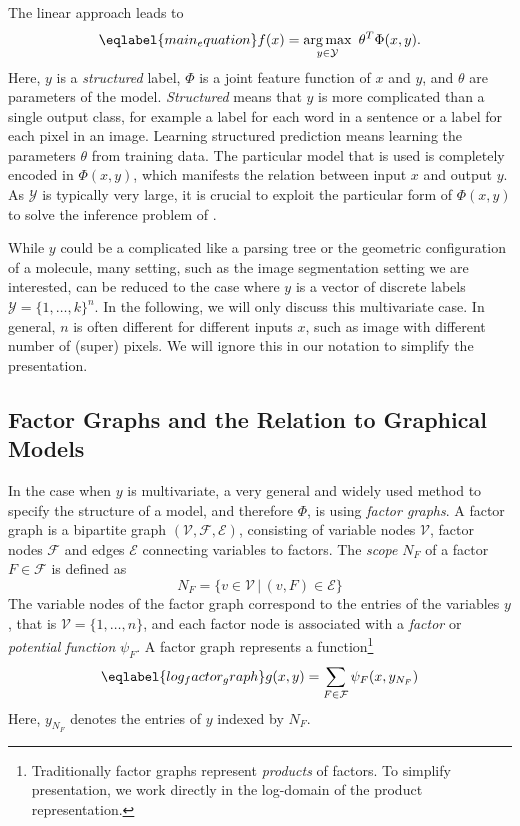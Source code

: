 The linear approach leads to
\begin{equation}\eqlabel{main_equation}
    f(x) = \argmax_{y \in \mathcal{Y}}\  \theta^T \Phi(x, y).
\end{equation}
Here, $y$ is a \emph{structured} label, $\Phi$ is a joint feature function of
$x$ and $y$, and $\theta$ are parameters of the model. \emph{Structured} means
that $y$ is more complicated than a single output class, for example a label
for each word in a sentence or a label for each pixel in an image.
Learning structured prediction means learning the parameters $\theta$ from
training data.  The particular model that is used is completely encoded in
$\Phi(x, y)$, which manifests the relation between input $x$ and output $y$. As
$\mathcal{Y}$ is typically very large, it is crucial to exploit the particular
form of $\Phi(x, y)$ to solve the inference problem of .

While $y$ could be a complicated like a parsing tree or the geometric
configuration of a molecule, many setting, such as the image segmentation
setting we are interested, can be reduced to the case where $y$ is a vector of
discrete labels $\mathcal{Y} = \{1, \dotsc, k\}^n$.
In the following, we will only discuss this multivariate case. In general, $n$
is often different for different inputs $x$, such as image with different
number of (super) pixels.  We will ignore this in our notation to simplify the
presentation.

\subsection{Factor Graphs and the Relation to Graphical Models}
In the case when $y$ is multivariate, a very general and widely used method to
specify the structure of a model, and therefore $\Phi$, is using \emph{factor
graphs}. A factor graph is a bipartite graph $(\mathcal{V}, \mathcal{F},
\mathcal{E})$, consisting of variable nodes $\mathcal{V}$, factor nodes
$\mathcal{F}$ and edges $\mathcal{E}$ connecting variables to factors. The
\emph{scope} $N_F$ of a factor $F \in \mathcal{F}$ is defined as
\begin{equation}
    N_F = \{ v \in \mathcal{V} \,|\, (v,F) \in \mathcal{E} \}
\end{equation}
The variable nodes of the factor graph correspond to the entries of the
variables $y$, that is $\mathcal{V} = \{1, \dotsc, n\}$, and each factor node
is associated with a \emph{factor} or \emph{potential function} $\psi_F$.
A factor graph represents a function\footnote{Traditionally factor graphs
 represent \emph{products} of factors.  To simplify presentation, we work
directly in the log-domain of the product representation.}
\begin{equation}\eqlabel{log_factor_graph}
    g(x, y) = \sum_{F \in \mathcal{F}} \psi_F(x, y_{N_F})
\end{equation}
Here, $y_{N_F}$ denotes the entries of $y$ indexed by $N_F$.

